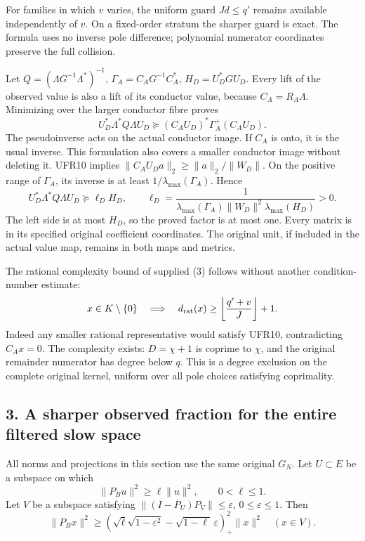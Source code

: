 For families in which \(v\) varies, the uniform guard \(Jd\le q'\) remains available independently of \(v\). On a fixed-order stratum the sharper guard is exact. The formula uses no inverse pole difference; polynomial numerator coordinates preserve the full collision.

Let \(Q=(\Lambda G^{-1}\Lambda^*)^{-1}\), \(\Gamma_A=C_AG^{-1}C_A^*\), \(H_D=U_D^*GU_D\). Every lift of the observed value is also a lift of its conductor value, because \(C_A=R_A\Lambda\). Minimizing over the larger conductor fibre proves \[
U_D^*\Lambda^*Q\Lambda U_D
 \succeq (C_AU_D)^*\Gamma_A^+(C_AU_D).                            \tag{UFR11}
\] The pseudoinverse acts on the actual conductor image. If \(C_A\) is onto, it is the usual inverse. This formulation also covers a smaller conductor image without deleting it. UFR10 implies \(\|C_AU_Da\|_2\ge\|a\|_2/\|W_D\|\). On the positive range of \(\Gamma_A\), its inverse is at least \(1/\lambda_{\max}(\Gamma_A)\). Hence \[
U_D^*\Lambda^*Q\Lambda U_D\succeq \ell_D H_D,\qquad
\ell_D=\frac1{\lambda_{\max}(\Gamma_A)\|W_D\|^2\lambda_{\max}(H_D)}>0.
                                                                    \tag{UFR12}
\] The left side is at most \(H_D\), so the proved factor is at most one. Every matrix is in its specified original coefficient coordinates. The original unit, if included in the actual value map, remains in both maps and metrics.

The rational complexity bound of supplied (3) follows without another condition-number estimate: \[
x\in K\setminus\{0\}\quad\Longrightarrow\quad
d_{\rm rat}(x)\ge\left\lfloor\frac{q'+v}{J}\right\rfloor+1.
\] Indeed any smaller rational representative would satisfy UFR10, contradicting \(C_Ax=0\). The complexity exists: \(D=\chi+1\) is coprime to \(\chi\), and the original remainder numerator has degree below \(q\). This is a degree exclusion on the complete original kernel, uniform over all pole choices satisfying coprimality.

\subsection{3. A sharper observed fraction for the entire filtered slow space}\label{a-sharper-observed-fraction-for-the-entire-filtered-slow-space}

All norms and projections in this section use the same original \(G_N\). Let \(U\subset E\) be a subspace on which \[
\|P_Bu\|^2\ge\ell\|u\|^2,\qquad 0<\ell\le1.                     \tag{UFR13}
\] Let \(V\) be a subspace satisfying \(\|(I-P_U)P_V\|\le\varepsilon\), \(0\le\varepsilon\le1\). Then \[
\boxed{\|P_Bx\|^2\ge
\left(\sqrt\ell\sqrt{1-\varepsilon^2}
       -\sqrt{1-\ell}\,\varepsilon\right)_+^2\|x\|^2
\quad(x\in V).}                                                 \tag{UFR14}
\]

